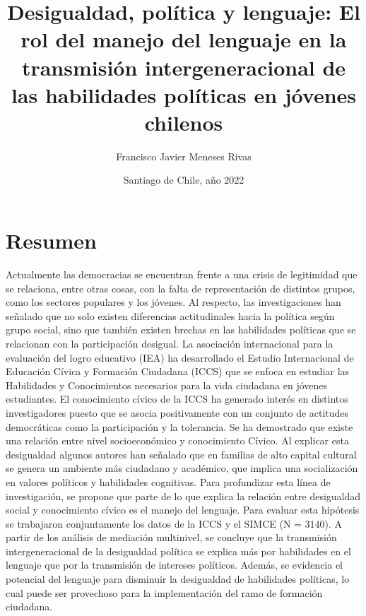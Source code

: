 \documentclass[12pt,twoside]{templates/facsothesis}
\title{Desigualdad, política y lenguaje: El rol del manejo del lenguaje en la transmisión intergeneracional de las habilidades políticas en jóvenes chilenos}
\author{Francisco Javier Meneses Rivas}
\date{Santiago de Chile, año 2022}
\begin{document}

  \maketitle

\frontmatter %
\pagestyle{empty} %



  \setcounter{tocdepth}{1}
  \setlength{\parskip}{0pt}
  \tableofcontents

\setlength\parskip{1em plus 0.1em minus 0.2em}

  \listoftables

  \listoffigures



\mainmatter %
\pagestyle{fancyplain} %

\hypertarget{resumen}{%
\chapter*{Resumen}\label{resumen}}

Actualmente las democracias se encuentran frente a una crisis de legitimidad que se relaciona, entre otras cosas, con la falta de representación de distintos grupos, como los sectores populares y los jóvenes. Al respecto, las investigaciones han señalado que no solo existen diferencias actitudinales hacia la política según grupo social, sino que también existen brechas en las habilidades políticas que se relacionan con la participación desigual. La asociación internacional para la evaluación del logro educativo (IEA) ha desarrollado el Estudio Internacional de Educación Cívica y Formación Ciudadana (ICCS) que se enfoca en estudiar las Habilidades y Conocimientos necesarios para la vida ciudadana en jóvenes estudiantes. El conocimiento cívico de la ICCS ha generado interés en distintos investigadores puesto que se asocia positivamente con un conjunto de actitudes democráticas como la participación y la tolerancia. Se ha demostrado que existe una relación entre nivel socioeconómico y conocimiento Cívico. Al explicar esta desigualdad algunos autores han señalado que en familias de alto capital cultural se genera un ambiente más ciudadano y académico, que implica una socialización en valores políticos y habilidades cognitivas. Para profundizar esta línea de investigación, se propone que parte de lo que explica la relación entre desigualdad social y conocimiento cívico es el manejo del lenguaje. Para evaluar esta hipótesis se trabajaron conjuntamente los datos de la ICCS y el SIMCE (N = 3140). A partir de los análisis de mediación multinivel, se concluye que la transmisión intergeneracional de la desigualdad política se explica más por habilidades en el lenguaje que por la transmisión de intereses políticos. Además, se evidencia el potencial del lenguaje para disminuir la desigualdad de habilidades políticas, lo cual puede ser provechoso para la implementación del ramo de formación ciudadana.
\end{document}
